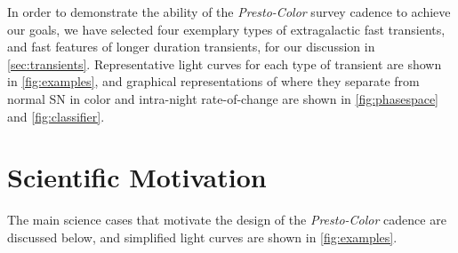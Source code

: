 \documentclass[letterpaper,longauthor,trackchanges,twocolumn,onecolappendix,sort&compress]{aastex62}
\begin{document}

In order to demonstrate the ability of the {\em Presto-Color} survey cadence to achieve our goals, we have selected four exemplary types of extragalactic fast transients, and fast features of longer duration transients, for our discussion in \autoref{sec:transients}. Representative light curves for each type of transient are shown in \autoref{fig:examples}, and graphical representations of where they separate from normal SN in color and intra-night rate-of-change are shown in \autoref{fig:phasespace} and \autoref{fig:classifier}.  

\section{Scientific Motivation}\label{sec:transients}

The main science cases that motivate the design of the {\em Presto-Color} cadence are discussed below, and simplified light curves are shown in \autoref{fig:examples}.
\end{document}
